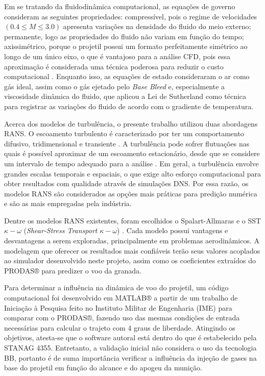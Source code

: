 Em se tratando da fluidodinâmica computacional, as equações de governo consideram as seguintes propriedades: compressível, pois o regime de velocidades \(\left(\num{0,4} \leq M \leq \num{3,0}\right)\) apresenta variações na densidade do fluido do meio externo; permanente, logo as propriedades do fluido não variam em função do tempo; axissimétrico, porque o projetil possui um formato perfeitamente simétrico ao longo de um único eixo, o que é vantajoso para a análise CFD, pois essa aproximação é considerada uma técnica poderosa para reduzir o custo computacional \cite{Lucena2020}. Enquanto isso, as equações de estado consideraram o ar como gás ideal, assim como o gás ejetado pelo \textit{Base Bleed} e, especialmente a viscosidade dinâmica do fluido, que aplicou a Lei de Sutherland como técnica para registrar as variações do fluido de acordo com o gradiente de temperatura.

Acerca dos modelos de turbulência, o presente trabalho utilizou duas abordagens RANS. O escoamento turbulento é caracterizado por ter um comportamento difusivo, tridimensional e transiente \cite{Rezende2009}. A turbulência pode sofrer flutuações nas quais é possível aproximar de um escoamento estacionário, desde que se considere um intervalo de tempo adequado para a análise \cite{Souza2011,SilveiraNeto2002}. Em geral, a turbulência envolve grandes escalas temporais e espaciais, o que exige alto esforço computacional para obter resultados com qualidade através de simulações DNS. Por essa razão, os modelos RANS são considerados as opções mais práticas para predição numérica e são as mais empregadas pela indústria.
	
Dentre os modelos RANS existentes, foram escolhidos o Spalart-Allmaras \cite{Spalart1992} e o SST \(\kappa-\omega\) (\textit{Shear-Stress Transport} \(\kappa-\omega\)) \cite{Menter1994TwoequationET,Menter2003,Menter2009}. Cada modelo possui vantagens e desvantagens a serem exploradas, principalmente em problemas aerodinâmicos. A modelagem que oferecer os resultados mais confiáveis terão seus valores acoplados ao simulador desenvolvido neste projeto, assim como os coeficientes extraídos do PRODAS® para predizer o voo da granada.

Para determinar a influência na dinâmica de voo do projetil, um código computacional foi desenvolvido em MATLAB® a partir de um trabalho de Iniciação à Pesquisa feito no Instituto Militar de Engenharia (IME) \cite{ThallyoENCIT2022,Thallyo2022} para comparar com o PRODAS®, fazendo uso das mesmas condições de entrada necessárias para calcular o trajeto com 4 graus de liberdade. Atingindo os objetivos, atesta-se que o software autoral está dentro do que é estabelecido pela STANAG 4355. Entretanto, a validação inicial não considera o uso da tecnologia BB, portanto é de suma importância verificar a influência da injeção de gases na base do projetil em função do alcance e do apogeu da munição. 

